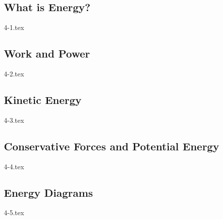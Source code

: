 \subsection{What is Energy?}

{4-1.tex}

\subsection{Work and Power}

{4-2.tex}

\subsection{Kinetic Energy}

{4-3.tex}

\subsection{Conservative Forces and Potential Energy}

{4-4.tex}

\subsection{Energy Diagrams}

{4-5.tex}